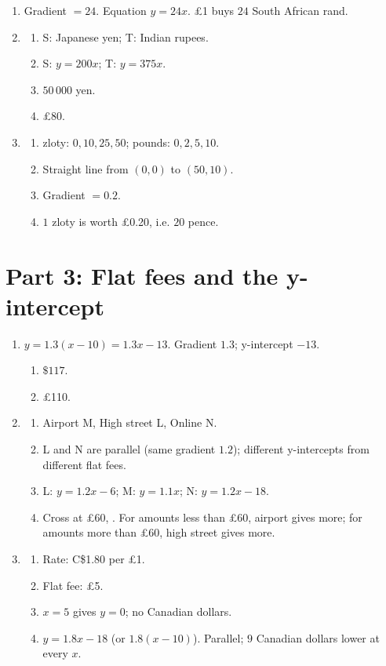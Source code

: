 \documentclass[12pt,a4paper]{article}
\begin{document}
\begin{enumerate}[resume]
\item Gradient \(=24\). Equation \(y=24x\). \pounds1 buys \(24\) South African rand.

\item
\begin{enumerate}
\item S: Japanese yen; T: Indian rupees.
\item S: \(y=200x\); T: \(y=375x\).
\item \(50\,000\) yen.
\item \pounds80.
\end{enumerate}

\item
\begin{enumerate}
\item zloty: \(0,10,25,50\); pounds: \(0,2,5,10\).
\item Straight line from \((0,0)\) to \((50,10)\).
\item Gradient \(=0.2\).
\item \(1\) zloty is worth \pounds0.20, i.e. \(20\) pence.
\end{enumerate}
\end{enumerate}

\section*{Part 3: Flat fees and the y-intercept}

\begin{enumerate}[resume]
\item \(y=1.3(x-10)=1.3x-13\). Gradient \(1.3\); y-intercept \(-13\).
\begin{enumerate}
\item \(\$117\).
\item \pounds110.
\end{enumerate}

\item
\begin{enumerate}
\item Airport M, High street L, Online N.
\item L and N are parallel (same gradient \(1.2\)); different y-intercepts from different flat fees.
\item L: \(y=1.2x-6\); M: \(y=1.1x\); N: \(y=1.2x-18\).
\item Cross at \pounds60, . For amounts less than \pounds60, airport gives more; for amounts more than \pounds60, high street gives more.
\end{enumerate}

\item
\begin{enumerate}
\item Rate: C\$1.80 per \pounds1.
\item Flat fee: \pounds5.
\item \(x=5\) gives \(y=0\); no Canadian dollars.
\item \(y=1.8x-18\) (or \(1.8(x-10)\)). Parallel; \(9\) Canadian dollars lower at every \(x\).
\end{enumerate}
\end{enumerate}
\end{document}
